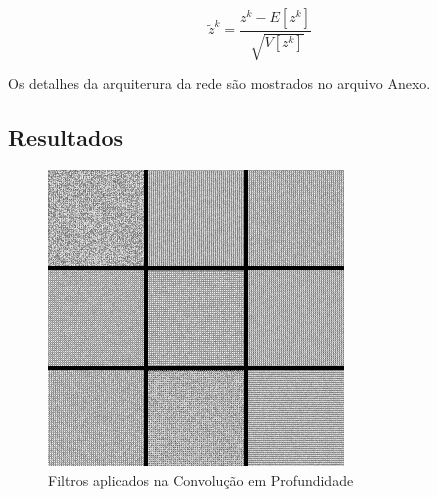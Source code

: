 \documentclass{bmvc2k}
\begin{document}
\begin{equation}
\tilde z ^k = \frac{z^k - E[z^k]}{\sqrt[]{V[z^k]}}
\end{equation}

Os detalhes da arquiterura da rede são mostrados no arquivo Anexo.

\subsection*{Resultados}

\begin{figure}[ht]
\centering
\includegraphics[scale=0.5]{imagens/stitched_filters_3x3.png} 
\caption{Filtros aplicados na Convolução em Profundidade}
\end{figure}

\newpage
\end{document}
